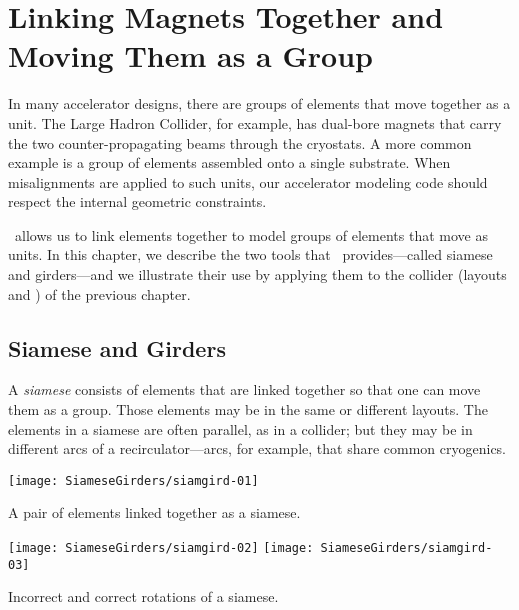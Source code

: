 
\chapter{Linking Magnets Together and Moving Them as a Group}
\label{cha:girders}


%
In many accelerator designs, there are groups of elements that move
together as a unit. The Large Hadron Collider, for example, has
dual-bore magnets that carry the two counter-propagating beams through
the cryostats. A more common example is a group of elements assembled
onto a single substrate. When misalignments are applied to
such units, our accelerator modeling code should respect the internal
geometric constraints.

\PTC\ allows us to link elements together to model groups of elements
that move as units. In this chapter, we describe the two tools that
\PTC\ provides---called siamese and girders---and we illustrate their
use by applying them to the collider (layouts  and )
of the previous chapter.


\section{Siamese and Girders}
\label{sec:siamese.girders}

%
A \emph{siamese} consists of elements that are linked together so
that one can move them as a group. Those elements may be in the
same or different layouts. The elements in a siamese are often
parallel, as in a collider; but they may be in different arcs of
a recirculator---arcs, for example, that share common cryogenics.

\begin{marginfigure}[3\baselineskip]\forcerectofloat
  \texttt{[image: SiameseGirders/siamgird-01]}
  \caption{A pair of elements linked together as a siamese.}
  \label{fig:ll.siamese}
\end{marginfigure}

\begin{marginfigure}
  \texttt{[image: SiameseGirders/siamgird-02]}\quad
  \texttt{[image: SiameseGirders/siamgird-03]}
  \caption{Incorrect and correct rotations of a siamese.}
  \label{fig:siamese.rot}
\end{marginfigure}

